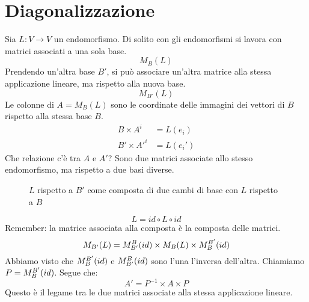 \section{Diagonalizzazione}

Sia $L : V \to V$ un endomorfismo. Di solito con gli endomorfismi si lavora con matrici associati a una sola base.
\[
M_{B} (L)
\]
Prendendo un'altra base $B'$, si pu\`o associare un'altra matrice alla stessa applicazione lineare, ma rispetto alla nuova base.
\[
M_{B'} (L)
\]
Le colonne di $A = M_{B} (L)$ sono le coordinate delle immagini dei vettori di $B$ rispetto alla stessa base $B$.
\begin{align*}
B \times A^i &= L(e_i) \\
B' \times {A'}^i &= L(e_i')
\end{align*}
Che relazione c'\`e tra $A$ e $A'$? Sono due matrici associate allo stesso endomorfismo, ma rispetto a due basi diverse.

\begin{figure}[ht]
\centering
{}
\caption{$L$ rispetto a $B'$ come composta di due cambi di base con $L$ rispetto a $B$}
\end{figure}
\[
L = id \circ L \circ id
\]
Remember: la matrice associata alla composta \`e la composta delle matrici.
\[
M_{B'} (L) =
M_{B'}^{B} (id) \times M_{B} (L) \times M_{B}^{B'} (id)
\]
Abbiamo visto che $M_{B}^{B'} (id)$ e $M_{B'}^{B} (id)$ sono l'una l'inversa dell'altra. Chiamiamo $P = M_{B}^{B'} (id)$. Segue che:
\[
A' = P^{-1} \times A \times P
\]
Questo \`e il legame tra le due matrici associate alla stessa applicazione lineare.

